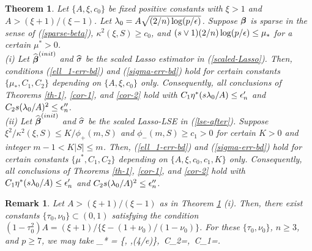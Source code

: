 \documentclass[11pt]{amsart}
\newtheorem{theorem}{Theorem}
\newtheorem{remark}{Remark}
\begin{document}
\begin{theorem}\label{th-2} 
Let $\{A,\xi,{c}_0\}$ be fixed positive constants with $\xi>1$ and $A > (\xi+1)/(\xi-1)$. 
Let $\lambda_0=A\sqrt{(2/n)\log(p/\epsilon)}$. 
Suppose $\boldsymbol{\beta}$ is sparse in the sense of (\ref{sparse-beta}), 
$\kappa^2(\xi,S)\ge {c}_0$, and $(s\vee 1)(2/n)\log(p/\epsilon)\le \mu_*$ for a certain $\mu^*>0$. \\
(i) Let ${\widehat{\boldsymbol{\beta}}}^{(init)}$ and $\widehat{\sigma}$ be the scaled Lasso estimator in (\ref{scaled-Lasso}).  
Then, conditions (\ref{ell_1-err-bd}) and (\ref{sigma-err-bd}) hold for certain constants 
$\{\mu_*,C_1,C_2\}$ depending on $\{A,\xi,{c}_0\}$ only. 
Consequently, all conclusions of Theorems \ref{th-1}, \ref{cor-1}, and \ref{cor-2} hold with
$C_1\eta^*(s\lambda_0/A)\le \epsilon_n'$ and $C_2s(\lambda_0/A)^2 \le \epsilon_n''$. \\
(ii) Let ${\widehat{\boldsymbol{\beta}}}^{(init)}$ and $\widehat{\sigma}$ be the {scaled Lasso-LSE} in (\ref{lse-after}). 
Suppose $\xi^2/\kappa^2(\xi,S) \le K/\phi_+(m,S)$ and $\phi_-(m,S)\ge {c}_1>0$ for certain $K>0$ and 
integer $m-1< K|S|\le m$. 
Then, (\ref{ell_1-err-bd}) and (\ref{sigma-err-bd}) hold for certain constants $\{\mu^*,C_1,C_2\}$ 
depending on $\{A,\xi,{c}_0,{c}_1,K\}$ only. 
Consequently, 
all conclusions of Theorems \ref{th-1}, \ref{cor-1}, and \ref{cor-2} hold with
$C_1\eta^*(s\lambda_0/A)\le \epsilon_n'$ and $C_2s(\lambda_0/A)^2 \le \epsilon_n''$. 
\end{theorem}

\begin{remark}\label{remark-th2} 
Let $A>(\xi+1)/(\xi-1)$ as in Theorem \ref{th-2} (i). Then, there exist constants $\{\tau_0,\nu_0\}\subset (0,1)$ 
satisfying the condition $(1-\tau_0^2)A = (\xi+1)/\{\xi-(1+\nu_0)/(1-\nu_0)\}$. 
For these $\{\tau_0,\nu_0\}$, $n\ge 3$, and $p\ge 7$, we may take 
\mu_* = \min\Big\{, ,\log(4/e)\Big\},\ 
C_2=,\ 
C_1=. 
\eel
\end{remark}

\medskip
\end{document}

